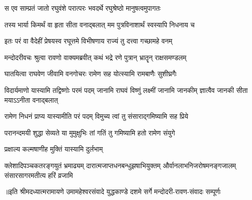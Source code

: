 \twolineshloka
{स एव साम्प्रतं जातो रघुवंशे परात्परः}
{भवदर्थे रघुश्रेष्ठो मानुषत्वमुपागतः} %

\twolineshloka
{तस्य भार्या किमर्थं वा हृता सीता वनाद्बलात्}
{मम पुत्रविनाशार्थं स्वस्यापि निधनाय च} %

\twolineshloka
{इतः परं वा वैदेहीं प्रेषयस्व रघूत्तमे}
{विभीषणाय राज्यं तु दत्त्वा गच्छामहे वनम्} %

\twolineshloka
{मन्दोदरीवचः श्रुत्वा रावणो वाक्यमब्रवीत्}
{कथं भद्रे रणे पुत्रान् भ्रातॄन् राक्षसमण्डलम्} %

\twolineshloka
{घातयित्वा राघवेण जीवामि वनगोचरः}
{रामेण सह योत्स्यामि रामबाणैः सुशीघ्रगैः} %

\threelineshloka
{विदार्यमाणो यास्यामि तद्विष्णोः परमं पदम्}
{जानामि राघवं विष्णुं लक्ष्मीं जानामि जानकीम्}
{ज्ञात्वैव जानकी सीता मयाऽऽनीता वनाद्बलात्} %

\twolineshloka
{रामेण निधनं प्राप्य यास्यामीति परं पदम्}
{विमुच्य त्वां तु संसाराद्गमिष्यामि सह प्रिये} %

\twolineshloka
{परानन्दमयी शुद्धा सेव्यते या मुमुक्षुभिः}
{तां गतिं तु गमिष्यामि हतो रामेण संयुगे} %

\onelineshloka
{प्रक्षाल्य कल्मषाणीह मुक्तिं यास्यामि दुर्लभाम्} %

\fourlineindentedshloka
{क्लेशादिपञ्चकतरङ्गयुतं भ्रमाढ्यम्}
{दारात्मजाप्तधनबन्धुझषाभियुक्तम्}
{और्वानलाभनिजरोषमनङ्गजालम्}
{संसारसागरमतीत्य हरिं व्रजामि} %

{॥इति श्रीमदध्यात्मरामायणे उमामहेश्वरसंवादे युद्धकाण्डे दशमे  सर्गे  मन्दोदरी-रावण-संवादः  सम्पूर्णः}

